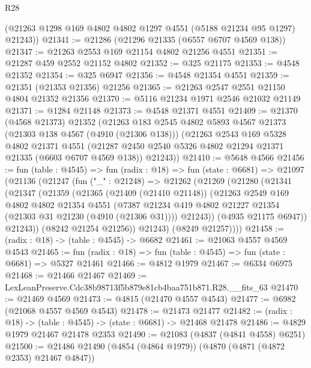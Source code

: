 \begin{lexlean}{R28}
\begin{coremodule}
      (@21263 @1298 @169 @4802 @4802 @1297 @4551 (@5188 @21234 @95 @1297) @21243))
@21341 := @21286 (@21296 @21335 (@6557 @6707 @4569 @138))
@21347 := @21263 @2553 @169 @21154 @4802 @21256 @4551
@21351 := @21287 @459 @2552 @21152 @4802
@21352 := @325 @21175
@21353 := @4548 @21352
@21354 := @325 @6947
@21356 := @4548 @21354 @4551
@21359 := @21351 (@21353 @21356) @21256
@21365 := @21263 @2547 @2551 @21150 @4804 @21352 @21356
@21370 := @5116 @21234 @1971 @2546 @21032 @21149
@21371 := @1284 @21148
@21373 := @4548 @21371 @4551
@21409 := @21370
    (@4568 @21373)
    @21352
    (@21263
      @183
      @2545
      @4802
      @5893
      @4567
      @21373
      (@21303 @138 @4567 (@4910 (@21306 @138)))
      (@21263
        @2543
        @169
        @5328
        @4802
        @21371
        @4551
        (@21287 @2450 @2540 @5326 @4802 @21294 @21371 @21335 (@6603 @6707 @4569 @138))
        @21243))
@21410 := @5648 @4566
@21456 := fun (table : @4545) =>
  fun (radix : @18) =>
  fun (state : @6681) =>
  @21097
    (@21136
      (@21247
        (fun ("_" : @21248) =>
        @21262
          (@21269
            (@21280
              (@21341
                (@21347
                  (@21359
                    (@21365
                      (@21409 (@21410 @21148))
                      (@21263
                        @2549
                        @169
                        @4802
                        @4802
                        @21354
                        @4551
                        (@7387
                          @21234
                          @419
                          @4802
                          @21227
                          @21354
                          (@21303 @31 @21230 (@4910 (@21306 @31))))
                        @21243))
                    (@4935 @21175 @6947))
                  @21243))
              (@8242 @21254 @21256))
            @21243)
          (@8249 @21257))))
@21458 := (radix : @18) -> (table : @4545) -> @6682
@21461 := @21063 @4557 @4569 @4543
@21465 := fun (radix : @18) => fun (table : @4545) => fun (state : @6681) => @5327 @21461
@21466 := @4812 @1979
@21467 := @6334 @6975
@21468 := @21466 @21467
@21469 := LexLeanPreserve.Cdc38b98713f5b879e81cb4baa751b871.R28.__fits_63
@21470 := @21469 @4569
@21473 := @4815 (@21470 @4557 @4543)
@21477 := @6982 (@21068 @4557 @4569 @4543)
@21478 := @21473 @21477
@21482 := (radix : @18) -> (table : @4545) -> (state : @6681) -> @21468 @21478
@21486 := @4829 @1979 @21467 @21478 @2353
@21490 := @21083 (@4837 (@4841 @4558) @6251)
@21500 := @21486 @21490 (@4854 (@4864 @1979)) (@4870 (@4871 (@4872 @2353) @21467 @4847))

\end{coremodule}
\end{lexlean}
